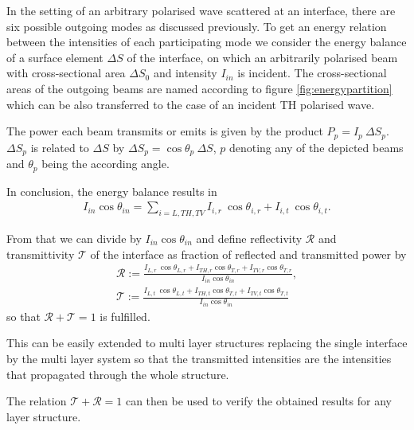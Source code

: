 In the setting of an arbitrary polarised wave scattered at an interface,
there are six possible outgoing modes as discussed previously.
To get an energy relation between the intensities of each
participating mode we consider the energy balance of a surface element
$\Delta S$ of the interface, on which an arbitrarily polarised beam with
cross-sectional
area $\Delta S_{0}$ and intensity $I_{in}$ is incident. The cross-sectional
areas of the outgoing beams are named according to figure
\ref{fig:energypartition} which can be also transferred to the case of an
incident TH polarised wave.

The power each beam transmits or emits is given by the product $P_p = I_p\
    \Delta S_p$. $\Delta S_p$ is related to $\Delta S$ by $\Delta S_p =
    \cos\theta_p\ \Delta S$,
$p$ denoting any of the depicted beams and $\theta_p$ being the according
angle.

In conclusion, the energy balance results in
\begin{align}
    I_{in} \cos\theta_{in} = \sum\limits_{i=L,TH,TV} I_{i,r}\  \cos\theta_{i,r}
    + I_{i,t}\	\cos\theta_{i,t} .
\end{align}

From that we can divide by $I_{in}\cos \theta_{in}$ and define reflectivity
$\mathcal{R}$ and transmittivity $\mathcal{T}$ of the
interface as fraction of reflected and transmitted power by
\begin{align}
    \mathcal{R} := \frac{ I_{L,r}\  \cos\theta_{L,r} + I_{TH,r}
        \cos\theta_{T,r} +
    I_{TV,r}  \cos\theta_{T,r}}{I_{in} \cos\theta_{in}} ,\\
    \mathcal{T} := \frac{ I_{L,t}\  \cos\theta_{L,t} + I_{TH,t}
        \cos\theta_{T,t} +
        I_{TV,t}  \cos\theta_{T,t}}{I_{in} \cos\theta_{in}}
\end{align}
so that $\mathcal{R} + \mathcal{T} = 1$ is fulfilled.

This can be easily extended to multi layer structures replacing the single
interface by the multi layer system so that the transmitted intensities are the
intensities that propagated through the whole structure.

The relation $\mathcal{T}+\mathcal{R}=1$ can then be used to verify the
obtained results for any layer structure.

